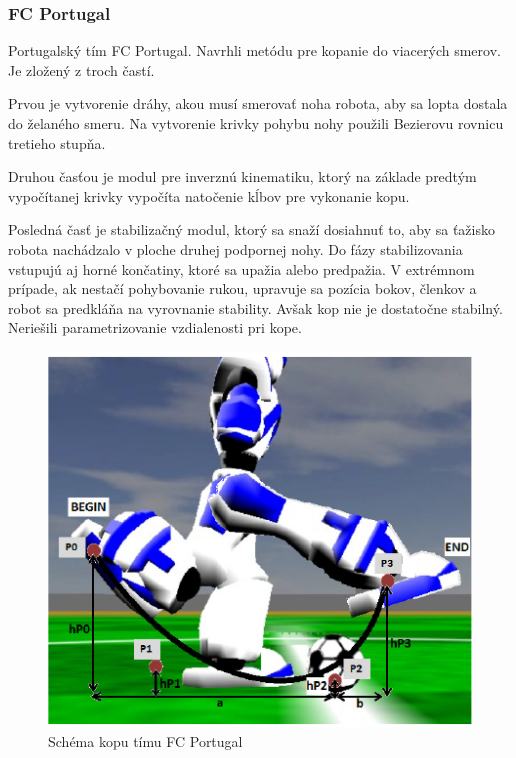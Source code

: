 \subsubsection{FC Portugal} \label{fc_portugal}

Portugalský tím FC Portugal\cite{fc_portugal}.
Navrhli metódu pre kopanie do viacerých smerov. Je zložený z troch častí. 

Prvou je vytvorenie dráhy, akou musí smerovať noha robota, aby sa lopta dostala do želaného smeru. Na vytvorenie krivky pohybu nohy použili Bezierovu rovnicu tretieho stupňa. 

Druhou časťou je modul pre inverznú kinematiku, ktorý na základe predtým vypočítanej krivky vypočíta natočenie kĺbov pre vykonanie kopu. 

Posledná časť je stabilizačný modul, ktorý sa snaží dosiahnuť to, aby sa ťažisko robota nachádzalo v ploche druhej podpornej nohy. Do fázy stabilizovania vstupujú aj horné končatiny, ktoré sa upažia alebo predpažia. V extrémnom prípade, ak nestačí pohybovanie rukou, upravuje sa pozícia bokov, členkov a robot sa predkláňa na vyrovnanie stability. Avšak kop nie je dostatočne stabilný. Neriešili parametrizovanie vzdialenosti pri kope.

\begin{figure}[H]
	\center
	\includegraphics[scale=1]{./data/kick_arch_fc_portugal}
	\caption{Schéma kopu tímu FC Portugal \cite{fc_portugal}}
	\label{pic_kick_arch_fc_portugal}
\end{figure}



